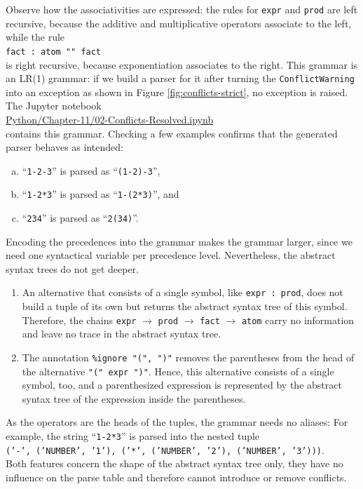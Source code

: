 \noindent
Observe how the associativities are expressed: the rules for \texttt{expr} and \texttt{prod} are left recursive,
because the additive and multiplicative operators associate to the left, while the rule
\\[0.2cm]
\hspace*{1.3cm}
\texttt{fact : atom "" fact}
\\[0.2cm]
is right recursive, because exponentiation associates to the right.  This grammar is an LR(1)
grammar: if we build a parser for it after turning the \texttt{ConflictWarning} into an exception as shown in
Figure \ref{fig:conflicts-strict}, no exception is raised.  The Jupyter notebook
\\[0.2cm]
\hspace*{1.3cm}
\href{https://github.com/karlstroetmann/Formal-Languages/tree/master/Python/Chapter-11/02-Conflicts-Resolved.ipynb}{Python/Chapter-11/02-Conflicts-Resolved.ipynb}
\\[0.2cm]
contains this grammar.  Checking a few examples confirms that the generated parser behaves as intended:
\begin{enumerate}[(a)]
\item ``\texttt{1-2-3}'' is parsed as ``\texttt{(1-2)-3}'',
\item ``\texttt{1-2*3}'' is parsed as ``\texttt{1-(2*3)}'', and
\item ``\texttt{234}'' is parsed as ``\texttt{2(34)}''.
\end{enumerate}


\remarkEng\label{remark:tree-shape}
Encoding the precedences into the grammar makes the grammar larger, since we need one syntactical variable per
precedence level.  Nevertheless, the abstract syntax trees do not get deeper.
\begin{enumerate}
\item An alternative that consists of a single symbol, like \texttt{expr : prod}, does not build a tuple of its
      own but returns the abstract syntax tree of this symbol.  Therefore, the chains \texttt{expr}
      $\rightarrow$ \texttt{prod} $\rightarrow$ \texttt{fact} $\rightarrow$ \texttt{atom} carry no information and
      leave no trace in the abstract syntax tree.
\item The annotation \texttt{\%ignore "(", ")"} removes the parentheses from the head of the alternative
      \texttt{"(" expr ")"}.  Hence, this alternative consists of a single symbol, too, and a parenthesized
      expression is represented by the abstract syntax tree of the expression inside the parentheses.
\end{enumerate}
As the operators are the heads of the tuples, the grammar needs no aliases:  For example, the string
``\texttt{1-2*3}'' is parsed into the nested tuple
\\[0.2cm]
\hspace*{1.3cm}
\texttt{('-', ('NUMBER', '1'), ('*', ('NUMBER', '2'), ('NUMBER', '3')))}.
\\[0.2cm]
Both features concern the shape of the abstract syntax tree only, they have no influence on the parse table and
therefore cannot introduce or remove conflicts.
\eox

